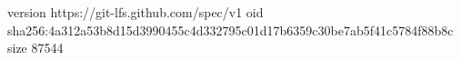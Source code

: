 version https://git-lfs.github.com/spec/v1
oid sha256:4a312a53b8d15d3990455c4d332795c01d17b6359c30be7ab5f41c5784f88b8c
size 87544
